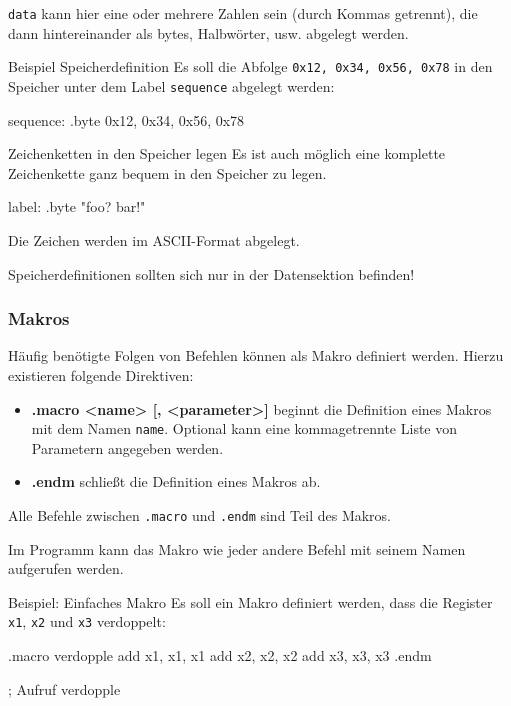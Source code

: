 \texttt{data} kann hier eine oder mehrere Zahlen sein (durch Kommas getrennt), die dann hintereinander als bytes, Halbwörter, usw. abgelegt werden.

\begin{exampleblock}{Beispiel Speicherdefinition}
	Es soll die Abfolge \texttt{0x12, 0x34, 0x56, 0x78} in den Speicher unter dem Label \texttt{sequence} abgelegt werden:
	\begin{riscv}
		sequence: .byte 0x12, 0x34, 0x56, 0x78
	\end{riscv}
\end{exampleblock}

\begin{infoblock}{Zeichenketten in den Speicher legen}
	Es ist auch möglich eine komplette Zeichenkette ganz bequem in den Speicher zu legen.
	\begin{riscv}
		label: .byte "foo? bar!"
	\end{riscv}
	Die Zeichen werden im ASCII-Format abgelegt.
\end{infoblock}

\begin{warningblock}
	Speicherdefinitionen sollten sich nur in der Datensektion befinden!
\end{warningblock}

\subsubsection{Makros}


Häufig benötigte Folgen von Befehlen können als Makro definiert werden. Hierzu
existieren folgende Direktiven:

\begin{itemize}
	\item \textbf{.macro <name> [, <parameter>]} beginnt die Definition eines
	Makros mit dem Namen \texttt{name}. Optional kann eine kommagetrennte Liste
	von Parametern angegeben werden.
	\item \textbf{.endm} schließt die Definition eines Makros ab.
\end{itemize}

Alle Befehle zwischen \texttt{.macro} und \texttt{.endm} sind Teil des Makros.

Im Programm kann das Makro wie jeder andere Befehl mit seinem Namen aufgerufen
werden.

\begin{exampleblock}{Beispiel: Einfaches Makro}
	Es soll ein Makro definiert werden, dass die Register \texttt{x1}, \texttt{x2}
	und \texttt{x3} verdoppelt:
	\begin{riscv}
		.macro verdopple
		add x1, x1, x1
		add x2, x2, x2
		add x3, x3, x3
		.endm

		; Aufruf
		verdopple
	\end{riscv}
\end{exampleblock}

